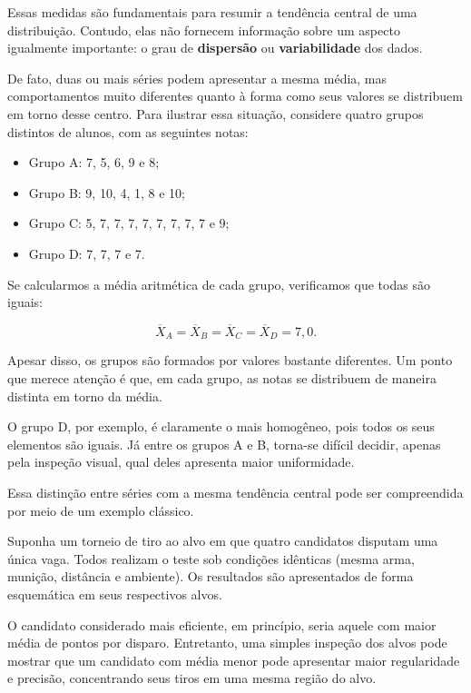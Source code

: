 Essas medidas são fundamentais para resumir a tendência central de uma
distribuição. Contudo, elas não fornecem informação sobre um aspecto igualmente
importante: o grau de \textbf{dispersão} ou \textbf{variabilidade} dos dados. \vskip0.3cm

De fato, duas ou mais séries podem apresentar a mesma média, mas comportamentos
muito diferentes quanto à forma como seus valores se distribuem em torno desse
centro. Para ilustrar essa situação, considere quatro grupos distintos de
alunos, com as seguintes notas: \vskip0.3cm

\begin{itemize}
    \item Grupo A: 7, 5, 6, 9 e 8;
    \item Grupo B: 9, 10, 4, 1, 8 e 10;
    \item Grupo C: 5, 7, 7, 7, 7, 7, 7, 7, 7 e 9;
    \item Grupo D: 7, 7, 7 e 7.
\end{itemize}

Se calcularmos a média aritmética de cada grupo, verificamos que todas são
iguais:

\[
\overline{X}_A=\overline{X}_B=\overline{X}_C=\overline{X}_D=7{,}0.
\]

Apesar disso, os grupos são formados por valores bastante diferentes. Um ponto
que merece atenção é que, em cada grupo, as notas se distribuem de maneira
distinta em torno da média. \vskip0.3cm

O grupo D, por exemplo, é claramente o mais homogêneo, pois todos os seus
elementos são iguais. Já entre os grupos A e B, torna-se difícil decidir, apenas
pela inspeção visual, qual deles apresenta maior uniformidade. \vskip0.3cm

Essa distinção entre séries com a mesma tendência central pode ser compreendida
por meio de um exemplo clássico. \vskip0.3cm

Suponha um torneio de tiro ao alvo em que quatro candidatos disputam uma única
vaga. Todos realizam o teste sob condições idênticas (mesma arma, munição,
distância e ambiente). Os resultados são apresentados de forma esquemática em
seus respectivos alvos. \vskip0.3cm

O candidato considerado mais eficiente, em princípio, seria aquele com maior
média de pontos por disparo. Entretanto, uma simples inspeção dos alvos pode
mostrar que um candidato com média menor pode apresentar maior regularidade e
precisão, concentrando seus tiros em uma mesma região do alvo. \vskip0.3cm

